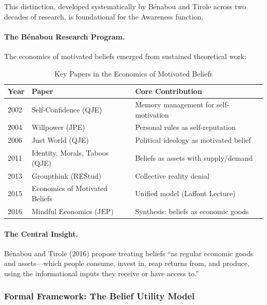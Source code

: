 This distinction, developed systematically by Bénabou and Tirole across two 
decades of research, is foundational for the Awareness function.

\paragraph{The Bénabou Research Program.}
The economics of motivated beliefs emerged from sustained theoretical work:

\begin{table}[htbp]
\centering
\caption{Key Papers in the Economics of Motivated Beliefs}
\label{tab:benabou-papers}
\renewcommand{\arraystretch}{1.3}
\small
\begin{tabular}{@{}llp{5.5cm}@{}}
\toprule
\textbf{Year} & \textbf{Paper} & \textbf{Core Contribution} \\
\midrule
2002 & Self-Confidence (QJE) & Memory management for self-motivation \\
2004 & Willpower (JPE) & Personal rules as self-reputation \\
2006 & Just World (QJE) & Political ideology as motivated belief \\
2011 & Identity, Morals, Taboos (QJE) & Beliefs as assets with supply/demand \\
2013 & Groupthink (REStud) & Collective reality denial \\
2015 & Economics of Motivated Beliefs & Unified model (Laffont Lecture) \\
2016 & Mindful Economics (JEP) & Synthesis: beliefs as economic goods \\
\bottomrule
\end{tabular}
\end{table}

\paragraph{The Central Insight.}
Bénabou and Tirole (2016) propose treating beliefs ``as regular economic goods 
and assets---which people consume, invest in, reap returns from, and produce, 
using the informational inputs they receive or have access to.''

\subsubsection{Formal Framework: The Belief Utility Model}
\label{subsubsec:formal-framework}

